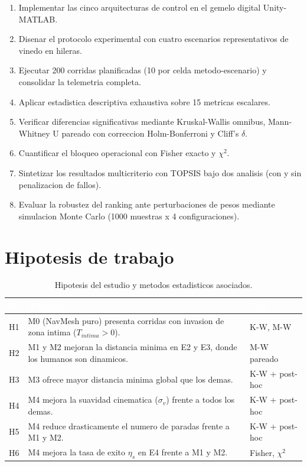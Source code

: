 \documentclass[12pt,a4paper,oneside]{book}
\begin{document}
\begin{enumerate}[leftmargin=*]
    \item Implementar las cinco arquitecturas de control en el gemelo digital Unity-MATLAB.
    \item Disenar el protocolo experimental con cuatro escenarios representativos de vinedo en hileras.
    \item Ejecutar 200 corridas planificadas (10 por celda metodo-escenario) y consolidar la telemetria completa.
    \item Aplicar estadistica descriptiva exhaustiva sobre 15 metricas escalares.
    \item Verificar diferencias significativas mediante Kruskal-Wallis omnibus, Mann-Whitney U pareado con correccion Holm-Bonferroni y Cliff's $\delta$.
    \item Cuantificar el bloqueo operacional con Fisher exacto y $\chi^2$.
    \item Sintetizar los resultados multicriterio con TOPSIS bajo dos analisis (con y sin penalizacion de fallos).
    \item Evaluar la robustez del ranking ante perturbaciones de pesos mediante simulacion Monte Carlo (1000 muestras x 4 configuraciones).
\end{enumerate}

\section{Hipotesis de trabajo}

\begin{table}[H]
\centering
\caption{Hipotesis del estudio y metodos estadisticos asociados.}
\renewcommand{\arraystretch}{1.4}
\small
\begin{tabular}{lp{8cm}l}
\toprule
\rowcolor{primary}
\textcolor{white}{\textbf{ID}} &
\textcolor{white}{\textbf{Hipotesis}} &
\textcolor{white}{\textbf{Test}} \\
\midrule
H1 & M0 (NavMesh puro) presenta corridas con invasion de zona intima ($T_{intima} > 0$). & K-W, M-W \\
H2 & M1 y M2 mejoran la distancia minima en E2 y E3, donde los humanos son dinamicos. & M-W pareado \\
H3 & M3 ofrece mayor distancia minima global que los demas. & K-W + post-hoc \\
H4 & M4 mejora la suavidad cinematica ($\sigma_v$) frente a todos los demas. & K-W + post-hoc \\
H5 & M4 reduce drasticamente el numero de paradas frente a M1 y M2. & K-W + post-hoc \\
H6 & M4 mejora la tasa de exito $\eta_s$ en E4 frente a M1 y M2. & Fisher, $\chi^2$ \\
\bottomrule
\end{tabular}
\end{table}
\end{document}
